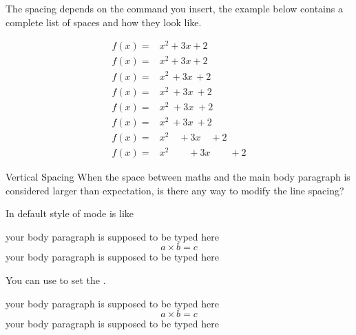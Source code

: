 \begin{frame}[fragile]
The spacing depends on the command you insert, the example below contains a complete list of spaces and how they look like.

\begin{latexexamplesplit}
\begin{align*}
f(x) =& x^2\! +3x\! +2 \\
f(x) =& x^2+3x+2 \\
f(x) =& x^2\, +3x\, +2 \\
f(x) =& x^2\: +3x\: +2 \\
f(x) =& x^2\; +3x\; +2 \\
f(x) =& x^2\ +3x\ +2 \\
f(x) =& x^2\quad +3x\quad +2 \\
f(x) =& x^2\qquad +3x\qquad +2
\end{align*}
\end{latexexamplesplit}

\end{frame}

\begin{frame}[fragile]{Vertical Spacing}
    When the space between  maths and the main body paragraph is considered larger than expectation, is there any way to modify the line spacing? \medskip
    
    In default style of  mode is like

\begin{latexexample}
your body paragraph is supposed to be typed here
\begin{equation}
  a \times b = c 
\end{equation}
your body paragraph is supposed to be typed here
\end{latexexample}

\end{frame}

\begin{frame}[fragile]
You can use \LC{\setlength} to set the . \medskip
	
\begin{command}
\begin{LCL}
\setlength{}
\setlength{}
\end{LCL}
\end{command}

\begin{latexexample}
\setlength\abovedisplayskip{0em}
\setlength\belowdisplayskip{0em}
your body paragraph is supposed to be typed here
\begin{equation}
  a \times b = c 
\end{equation}
your body paragraph is supposed to be typed here
\end{latexexample}

\end{frame}

